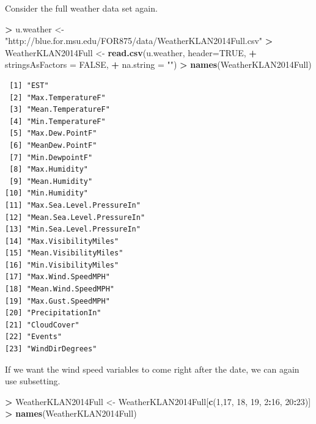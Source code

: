 \documentclass[]{krantz}
\makeatletter
\newenvironment{Shaded}{\begin{snugshade}}{\end{snugshade}}
\newcommand{\KeywordTok}[1]{\textcolor[rgb]{0.27,0.27,0.27}{\textbf{#1}}}
\newcommand{\DataTypeTok}[1]{\textcolor[rgb]{0.27,0.27,0.27}{#1}}
\newcommand{\DecValTok}[1]{\textcolor[rgb]{0.06,0.06,0.06}{#1}}
\newcommand{\StringTok}[1]{\textcolor[rgb]{0.5,0.5,0.5}{#1}}
\newcommand{\OtherTok}[1]{\textcolor[rgb]{0.37,0.37,0.37}{#1}}
\newcommand{\OperatorTok}[1]{\textcolor[rgb]{0.43,0.43,0.43}{\textbf{#1}}}
\newcommand{\NormalTok}[1]{#1}
\newenvironment{kframe}{%
\medskip{}
\setlength{\fboxsep}{.8em}
 \def\at@end@of@kframe{}%
 \ifinner\ifhmode%
  \def\at@end@of@kframe{\end{minipage}}%
  \begin{minipage}{\columnwidth}%
 \fi\fi%
 \def\FrameCommand##1{\hskip\@totalleftmargin \hskip-\fboxsep
 \colorbox{shadecolor}{##1}\hskip-\fboxsep
     \hskip-\linewidth \hskip-\@totalleftmargin \hskip\columnwidth}%
 \MakeFramed {\advance\hsize-\width
   \@totalleftmargin\z@ \linewidth\hsize
   \@setminipage}}%
 {\par\unskip\endMakeFramed%
 \at@end@of@kframe}
\renewenvironment{Shaded}{\begin{kframe}}{\end{kframe}}
\makeatother
\begin{document}
Consider the full weather data set again.

\begin{Shaded}
\begin{Highlighting}[]
\OperatorTok{>}\StringTok{ }\NormalTok{u.weather <-}\StringTok{ "http://blue.for.msu.edu/FOR875/data/WeatherKLAN2014Full.csv"}
\OperatorTok{>}\StringTok{ }\NormalTok{WeatherKLAN2014Full <-}\StringTok{ }\KeywordTok{read.csv}\NormalTok{(u.weather, }\DataTypeTok{header=}\OtherTok{TRUE}\NormalTok{, }
\OperatorTok{+}\StringTok{                                 }\DataTypeTok{stringsAsFactors =} \OtherTok{FALSE}\NormalTok{,}
\OperatorTok{+}\StringTok{                                 }\DataTypeTok{na.string =} \StringTok{""}\NormalTok{)}
\OperatorTok{>}\StringTok{ }\KeywordTok{names}\NormalTok{(WeatherKLAN2014Full)}
\end{Highlighting}
\end{Shaded}

\begin{verbatim}
 [1] "EST"                      
 [2] "Max.TemperatureF"         
 [3] "Mean.TemperatureF"        
 [4] "Min.TemperatureF"         
 [5] "Max.Dew.PointF"           
 [6] "MeanDew.PointF"           
 [7] "Min.DewpointF"            
 [8] "Max.Humidity"             
 [9] "Mean.Humidity"            
[10] "Min.Humidity"             
[11] "Max.Sea.Level.PressureIn" 
[12] "Mean.Sea.Level.PressureIn"
[13] "Min.Sea.Level.PressureIn" 
[14] "Max.VisibilityMiles"      
[15] "Mean.VisibilityMiles"     
[16] "Min.VisibilityMiles"      
[17] "Max.Wind.SpeedMPH"        
[18] "Mean.Wind.SpeedMPH"       
[19] "Max.Gust.SpeedMPH"        
[20] "PrecipitationIn"          
[21] "CloudCover"               
[22] "Events"                   
[23] "WindDirDegrees"           
\end{verbatim}

If we want the wind speed variables to come right after the date, we can
again use subsetting.

\begin{Shaded}
\begin{Highlighting}[]
\OperatorTok{>}\StringTok{ }\NormalTok{WeatherKLAN2014Full <-}\StringTok{ }\NormalTok{WeatherKLAN2014Full[}\KeywordTok{c}\NormalTok{(}\DecValTok{1}\NormalTok{,}\DecValTok{17}\NormalTok{, }\DecValTok{18}\NormalTok{, }\DecValTok{19}\NormalTok{, }\DecValTok{2}\OperatorTok{:}\DecValTok{16}\NormalTok{, }\DecValTok{20}\OperatorTok{:}\DecValTok{23}\NormalTok{)]}
\OperatorTok{>}\StringTok{ }\KeywordTok{names}\NormalTok{(WeatherKLAN2014Full)}
\end{Highlighting}
\end{Shaded}
\end{document}
